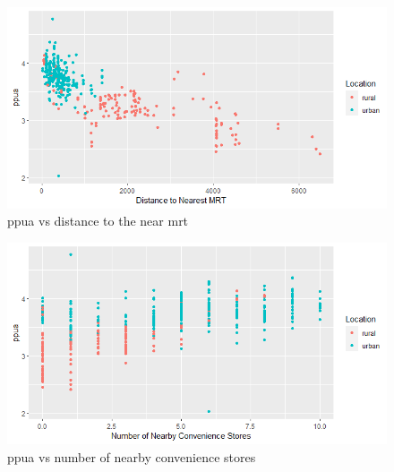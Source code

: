 

\begin{figure}[hbt!]
    \centering
    \includegraphics[scale=0.80]{img/mrttogether.png}
    \caption{ppua vs distance to the near mrt}
    \label{fig:mrt}
\end{figure}



\begin{figure}[hbt!]
    \centering
    \includegraphics[scale=0.80]{img/storestogether.png}
    \caption{ppua vs number of nearby convenience stores}
    \label{fig:stores}
\end{figure}

